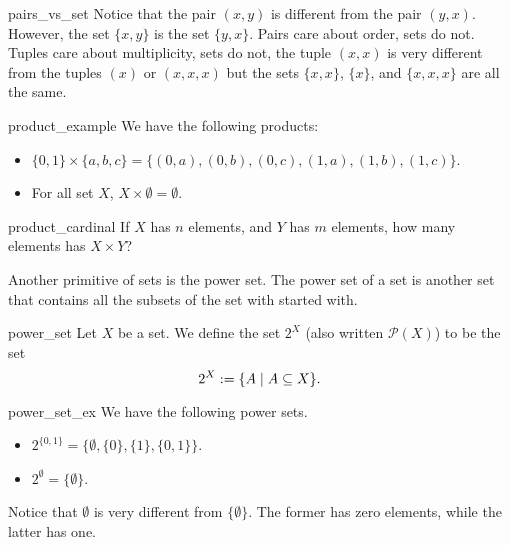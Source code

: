 \begin{crem}{}{pairs_vs_set}
    Notice that the pair \( (x, y) \) is different from the pair \( (y, x) \). However, the set \( \{ x, y \} \) is the set \( \{ y, x \} \). Pairs care about order, sets do not. Tuples care about multiplicity, sets do not, the tuple \( (x, x) \) is very different from the tuples \( (x) \) or \( (x, x, x) \) but the sets \( \{ x, x \} \), \( \{ x \} \), and \( \{ x, x, x \} \) are all the same.
\end{crem}

\begin{cexp}{}{product_example}
    We have the following products:
    \begin{itemize}
        \item \( \{ 0, 1 \} \times \{ a, b, c \} = \{ (0, a), (0, b), (0, c), (1, a), (1, b), (1, c) \} \).
        \item For all set \( X \), \( X \times \emptyset = \emptyset \).
    \end{itemize}
\end{cexp}

\begin{cex}{}{product_cardinal}
    If \( X \) has \( n \) elements, and \( Y \) has \( m \) elements, how many elements has \( X \times Y \)?
\end{cex}

Another primitive of sets is the power set. The power set of a set is another set that contains all the subsets of the set with started with.
\begin{cdef}{}{power_set}
    Let \( X \) be a set. We define the set \( 2^X \) (also written \( \mathcal{P}(X) \)) to be the set 
    \begin{equation*}
        2^X := \{ A \mid A \subseteq X \}.
    \end{equation*}
\end{cdef} 

\begin{cexp}{}{power_set_ex}
    We have the following power sets.
    \begin{itemize}
        \item \( 2^{\{0, 1\}} = \{ \emptyset, \{ 0 \}, \{ 1\}, \{ 0, 1\} \}\).
        \item \( 2^\emptyset = \{ \emptyset \} \).
    \end{itemize}
    Notice that \( \emptyset \) is very different from \( \{ \emptyset \} \). The former has zero elements, while the latter has one.
\end{cexp}

